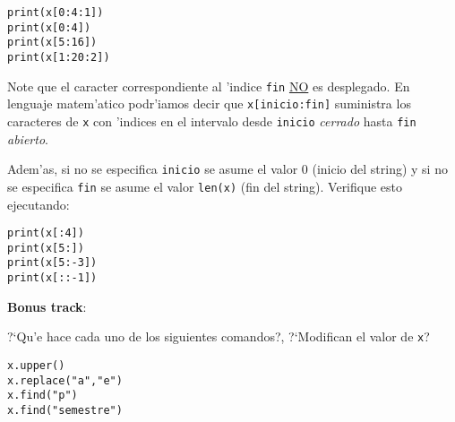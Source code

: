 \documentclass[11pt]{exam}
\begin{document}
\begin{questions}
\begin{verbatim}
print(x[0:4:1])
print(x[0:4])
print(x[5:16])
print(x[1:20:2])
\end{verbatim}

Note que el caracter correspondiente al 'indice \texttt{fin} \underline{NO} es desplegado. En lenguaje matem'atico podr'iamos decir que \texttt{x[inicio:fin]} suministra los caracteres de \texttt{x} con 'indices en el intervalo desde \texttt{inicio} \textit{cerrado} hasta \texttt{fin} \textit{abierto}.

\item Adem'as, si no se especifica \texttt{inicio} se asume el valor 0 (inicio del string) y si no se especifica \texttt{fin} se asume el valor \texttt{len(x)} (fin del string). Verifique esto ejecutando:

\begin{verbatim}
print(x[:4])
print(x[5:])
print(x[5:-3])
print(x[::-1])
\end{verbatim}

\item \textbf{Bonus track}: 

?`Qu'e hace cada uno de los siguientes comandos?, ?`Modifican el valor de \texttt{x}?

\begin{verbatim}
x.upper()
x.replace("a","e")
x.find("p")
x.find("semestre")
\end{verbatim}

\end{questions}
\end{document}
